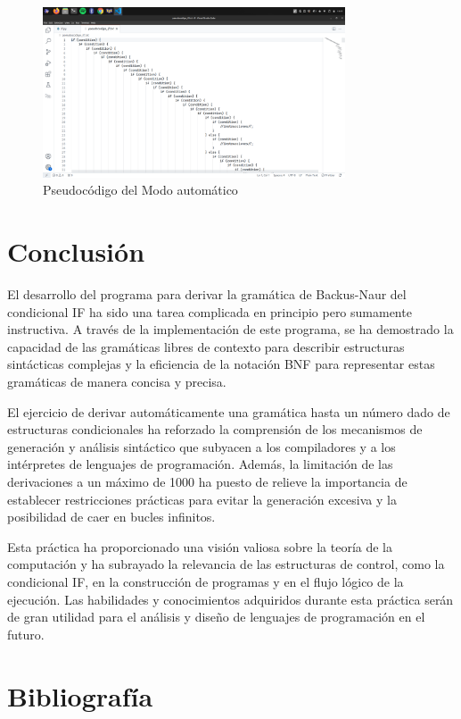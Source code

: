 \documentclass[11pt]{article} %
\begin{document}
	\begin{figure}[h]
		\centering
		\includegraphics[width=0.8\textwidth]{arch4,2}
		\caption{Pseudocódigo del Modo automático}
	\end{figure}
	
	\section*{Conclusión}
	El desarrollo del programa para derivar la gramática de Backus-Naur del condicional IF ha sido una tarea complicada en principio pero sumamente instructiva. A través de la implementación de este programa, se ha demostrado la capacidad de las gramáticas libres de contexto para describir estructuras sintácticas complejas y la eficiencia de la notación BNF para representar estas gramáticas de manera concisa y precisa. 
	
	El ejercicio de derivar automáticamente una gramática hasta un número dado de estructuras condicionales ha reforzado la comprensión de los mecanismos de generación y análisis sintáctico que subyacen a los compiladores y a los intérpretes de lenguajes de programación. Además, la limitación de las derivaciones a un máximo de 1000 ha puesto de relieve la importancia de establecer restricciones prácticas para evitar la generación excesiva y la posibilidad de caer en bucles infinitos. 
	
	Esta práctica ha proporcionado una visión valiosa sobre la teoría de la computación y ha subrayado la relevancia de las estructuras de control, como la condicional IF, en la construcción de programas y en el flujo lógico de la ejecución. Las habilidades y conocimientos adquiridos durante esta práctica serán de gran utilidad para el análisis y diseño de lenguajes de programación en el futuro.
	
	
	
	\section*{Bibliografía}
	
\end{document}
